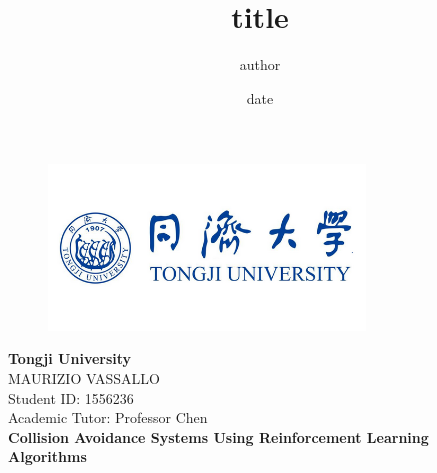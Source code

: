 \documentclass[14pt]{extarticle}
\def\ss{\vspace{25pt}}
\begin{document}
\title{title}
\author{author}
\date{date}

\begin{titlepage}
	\begin{figure}[t]
    		\centering\includegraphics[width=0.75\textwidth]{./Image/tongji-university1.png}
		\vspace{30mm}
	\end{figure}

	\begin{center}
	    	\textbf{ \LARGE{Tongji University\\}}
		\ss
		\textnormal{ \Large {MAURIZIO VASSALLO\\}}
		\textnormal{ \large {Student ID: 1556236\\}}
		\textnormal{ \large {Academic Tutor: Professor Chen\\}}
	    		\vspace{\fill}\textbf{\LARGE{Collision Avoidance Systems Using
Reinforcement Learning Algorithms\\}}\vspace*{\fill}%
	\end{center}
	
\end{titlepage}

\tableofcontents
\newpage
\end{document}
